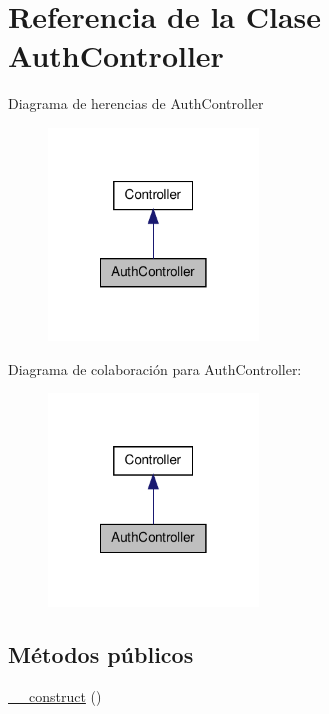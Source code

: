 \hypertarget{class_app_1_1_http_1_1_controllers_1_1_auth_1_1_auth_controller}{\section{\-Referencia de la \-Clase \-Auth\-Controller}
\label{class_app_1_1_http_1_1_controllers_1_1_auth_1_1_auth_controller}
}


\-Diagrama de herencias de \-Auth\-Controller
\nopagebreak
\begin{figure}[H]
\begin{center}
\leavevmode
\includegraphics[width=158pt]{class_app_1_1_http_1_1_controllers_1_1_auth_1_1_auth_controller__inherit__graph}
\end{center}
\end{figure}


\-Diagrama de colaboración para \-Auth\-Controller\-:
\nopagebreak
\begin{figure}[H]
\begin{center}
\leavevmode
\includegraphics[width=158pt]{class_app_1_1_http_1_1_controllers_1_1_auth_1_1_auth_controller__coll__graph}
\end{center}
\end{figure}
\subsection*{\-Métodos públicos}
\begin{DoxyCompactItemize}
\item 
\hyperlink{class_app_1_1_http_1_1_controllers_1_1_auth_1_1_auth_controller_a095c5d389db211932136b53f25f39685}{\-\_\-\-\_\-construct} ()
\end{DoxyCompactItemize}
